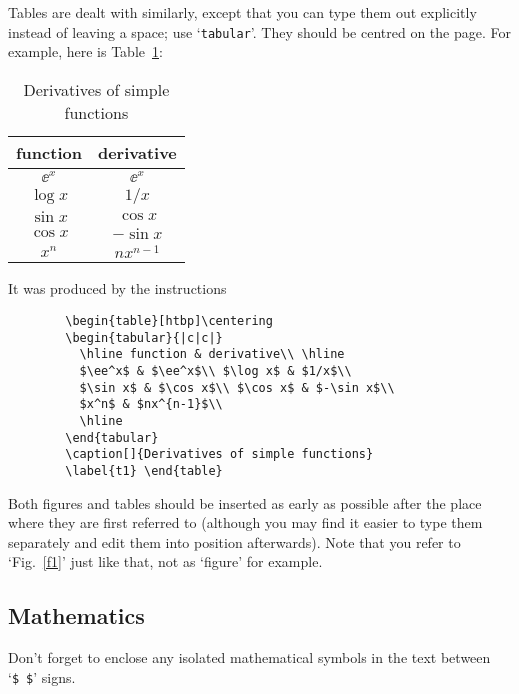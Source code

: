 Tables are dealt with similarly, except that you can type them out
explicitly instead of leaving a space; use `\verb!tabular!'. They should be
centred on the page. For example, here is Table~\ref{t1}:
        \begin{table}[htbp]\centering
        \begin{tabular}{|c|c|}
          \hline function & derivative\\ \hline
          $\ee^x$ & $\ee^x$\\ $\log x$ & $1/x$\\
          $\sin x$ & $\cos x$\\ $\cos x$ & $-\sin x$\\
          $x^n$ & $nx^{n-1}$\\
          \hline
        \end{tabular}
        \caption[]{Derivatives of simple functions}
        \label{t1} \end{table}
It was produced by the instructions
\begin{verbatim}
        \begin{table}[htbp]\centering
        \begin{tabular}{|c|c|}
          \hline function & derivative\\ \hline
          $\ee^x$ & $\ee^x$\\ $\log x$ & $1/x$\\
          $\sin x$ & $\cos x$\\ $\cos x$ & $-\sin x$\\
          $x^n$ & $nx^{n-1}$\\
          \hline
        \end{tabular}
        \caption[]{Derivatives of simple functions}
        \label{t1} \end{table}
\end{verbatim}
 
Both figures and tables should be inserted as early as possible after the
place where they are first referred to (although you may find it easier to
type them separately and edit them into position afterwards).   Note that
you refer to `Fig.~\ref{f1}' just like that, not as `figure' for example.
 
\subsection{Mathematics}
 
Don't forget to enclose any isolated mathematical symbols in the text
between `\verb!$!~\verb!$!' signs.
 
